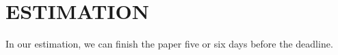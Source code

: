 \documentclass[12pt,conference]{ieeeconf} %
\begin{document}
\section{ESTIMATION}
In our estimation, we can finish the paper five or six days before the deadline. 

\vspace{\fill}
\printbibliography

\end{document}
